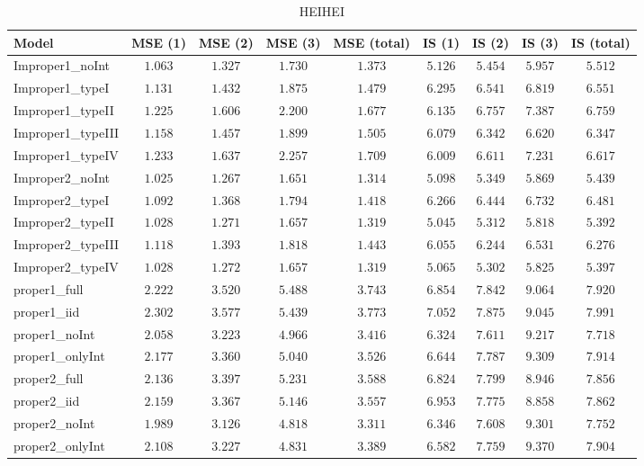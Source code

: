 \begin{table}

\caption{\label{tab:model-choice-sc5}HEIHEI}
\centering
\begin{tabular}{lcccccccc}
\hline
Model  & MSE (1) & MSE (2) & MSE (3) & MSE (total) & IS (1) & IS (2) & IS (3) & \multicolumn{1}{c}{IS (total)} \\ 
\hline
Improper1_noInt  & $1.063$ & $1.327$ & $1.730$ & $1.373$ & $5.126$ & $5.454$ & $5.957$ & $5.512$ \\
Improper1_typeI  & $1.131$ & $1.432$ & $1.875$ & $1.479$ & $6.295$ & $6.541$ & $6.819$ & $6.551$ \\
Improper1_typeII  & $1.225$ & $1.606$ & $2.200$ & $1.677$ & $6.135$ & $6.757$ & $7.387$ & $6.759$ \\
Improper1_typeIII  & $1.158$ & $1.457$ & $1.899$ & $1.505$ & $6.079$ & $6.342$ & $6.620$ & $6.347$ \\
Improper1_typeIV  & $1.233$ & $1.637$ & $2.257$ & $1.709$ & $6.009$ & $6.611$ & $7.231$ & $6.617$ \\
Improper2_noInt  & $1.025$ & $1.267$ & $1.651$ & $1.314$ & $5.098$ & $5.349$ & $5.869$ & $5.439$ \\
Improper2_typeI  & $1.092$ & $1.368$ & $1.794$ & $1.418$ & $6.266$ & $6.444$ & $6.732$ & $6.481$ \\
Improper2_typeII  & $1.028$ & $1.271$ & $1.657$ & $1.319$ & $5.045$ & $5.312$ & $5.818$ & $5.392$ \\
Improper2_typeIII  & $1.118$ & $1.393$ & $1.818$ & $1.443$ & $6.055$ & $6.244$ & $6.531$ & $6.276$ \\
Improper2_typeIV  & $1.028$ & $1.272$ & $1.657$ & $1.319$ & $5.065$ & $5.302$ & $5.825$ & $5.397$ \\
proper1_full  & $2.222$ & $3.520$ & $5.488$ & $3.743$ & $6.854$ & $7.842$ & $9.064$ & $7.920$ \\
proper1_iid  & $2.302$ & $3.577$ & $5.439$ & $3.773$ & $7.052$ & $7.875$ & $9.045$ & $7.991$ \\
proper1_noInt  & $2.058$ & $3.223$ & $4.966$ & $3.416$ & $6.324$ & $7.611$ & $9.217$ & $7.718$ \\
proper1_onlyInt  & $2.177$ & $3.360$ & $5.040$ & $3.526$ & $6.644$ & $7.787$ & $9.309$ & $7.914$ \\
proper2_full  & $2.136$ & $3.397$ & $5.231$ & $3.588$ & $6.824$ & $7.799$ & $8.946$ & $7.856$ \\
proper2_iid  & $2.159$ & $3.367$ & $5.146$ & $3.557$ & $6.953$ & $7.775$ & $8.858$ & $7.862$ \\
proper2_noInt  & $1.989$ & $3.126$ & $4.818$ & $3.311$ & $6.346$ & $7.608$ & $9.301$ & $7.752$ \\
proper2_onlyInt  & $2.108$ & $3.227$ & $4.831$ & $3.389$ & $6.582$ & $7.759$ & $9.370$ & $7.904$ \\
\hline 
\end{tabular}


\end{table}